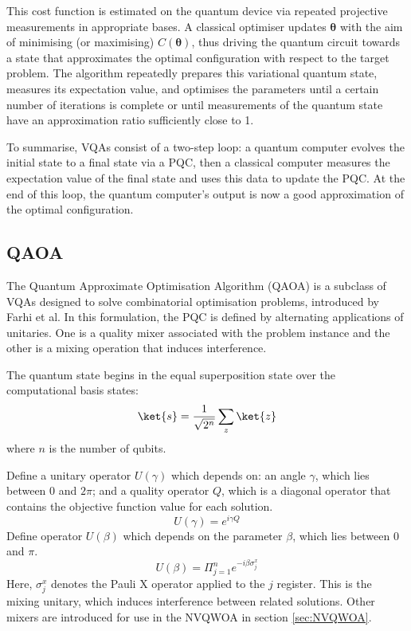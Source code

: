 This cost function is estimated on the quantum device via repeated projective measurements in appropriate bases. A classical optimiser updates $\mathbf{\theta}$ with the aim of minimising (or maximising) $C(\mathbf{\theta})$, thus driving the quantum circuit towards a state that approximates the optimal configuration with respect to the target problem. The algorithm repeatedly prepares this variational quantum state, measures its expectation value, and optimises the parameters until a certain number of iterations is complete or until measurements of the quantum state have an approximation ratio sufficiently close to 1.

To summarise, VQAs consist of a two-step loop: a quantum computer evolves the initial state to a final state via a PQC, then a classical computer measures the expectation value of the final state and uses this data to update the PQC. At the end of this loop, the quantum computer's output is now a good approximation of the optimal configuration.

\subsection{QAOA}
The Quantum Approximate Optimisation Algorithm (QAOA) is a subclass of VQAs designed to solve combinatorial optimisation problems, introduced by Farhi et al. \cite{QAOA} In this formulation, the PQC is defined by alternating applications of unitaries. One is a quality mixer associated with the problem instance and the other is a mixing operation that induces interference.

The quantum state begins in the equal superposition state over the computational basis states:
$$\ket{s}=\frac{1}{\sqrt{2^n}}\sum_{z}\ket{z}$$
where $n$ is the number of qubits.

Define a unitary operator $U(\gamma)$ which depends on: an angle $\gamma$, which lies between 0 and $2\pi$; and a quality operator $Q$, which is a diagonal operator that contains the objective function value for each solution.
$$U(\gamma)=e^{i\gamma Q}$$
Define operator $U(\beta)$ which depends on the parameter $\beta$, which lies between 0 and $\pi$.
$$U(\beta)=\Pi_{j=1}^{n} e^{-i\beta \sigma_j^x}$$
Here, $\sigma_j^x$ denotes the Pauli X operator applied to the $j$ register. This is the mixing unitary, which induces interference between related solutions. Other mixers are introduced for use in the NVQWOA in section \ref{sec:NVQWOA}.

